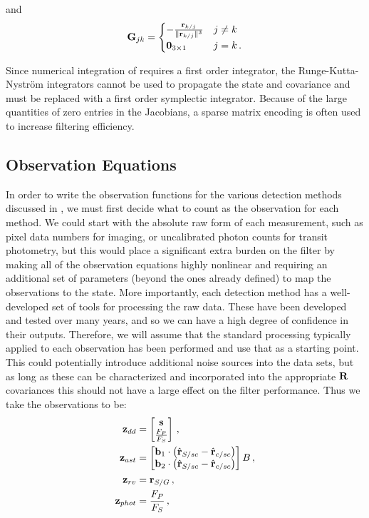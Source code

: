and
\begin{equation}
\mathbf G_{jk} =
\begin{cases}
 -\frac{\mathbf{r}_{k/j}}{\Vert\mathbf{r}_{k/j}\Vert^3} &
j \ne k \\
\mathbf 0_{3\times 1} & j = k \,.
\end{cases}
\end{equation}

Since numerical integration of  requires a first order integrator, the Runge-Kutta-Nystr\"{o}m integrators cannot be used to propagate the state and covariance and must be replaced with a first order symplectic integrator.  Because of the large quantities of zero entries in the Jacobians, a sparse matrix encoding is often used to increase filtering efficiency.

\subsection{Observation Equations}
In order to write the observation functions for the various detection methods discussed in , we must first decide what to count as the observation for each method.  We could start with the absolute raw form of each measurement, such as pixel data numbers for imaging, or uncalibrated photon counts for transit photometry, but this would place a significant extra burden on the filter by making all of the observation equations highly nonlinear and requiring an additional set of parameters (beyond the ones already defined) to map the observations to the state.  More importantly, each detection method has a well-developed set of tools for processing the raw data.  These have been developed and tested over many years, and so we can have a high degree of confidence in their outputs. Therefore, we will assume that the standard processing typically applied to each observation has been performed and use that as a starting point.  This could potentially introduce additional noise sources into the data sets, but as long as these can be characterized and incorporated into the appropriate $\mathbf R$ covariances this should not have a large effect on the filter performance.  Thus we take the observations to be:
\begin{align}
\mathbf z_{dd} &= \begin{bmatrix} \mathbf s \\ \frac{F_P}{F_S} \end{bmatrix} \,,\\
\mathbf z_{ast} &= \begin{bmatrix} \mathbf b_1 \cdot \left(\hat{\mathbf r}_{S/sc} - \hat{\mathbf r}_{c/sc}\right) \\\mathbf b_2 \cdot \left(\hat{\mathbf r}_{S/sc} - \hat{\mathbf r}_{c/sc}\right) \end{bmatrix} B \,,\\
\mathbf z_{rv} &=  \mathbf r_{S/G}\,,\\
\mathbf z_{phot} &= \frac{F_P}{F_S}\,,
\end{align}

